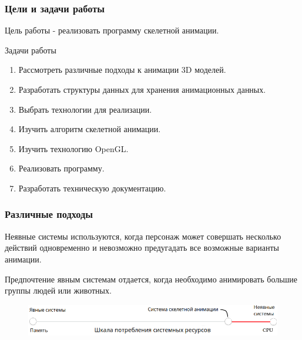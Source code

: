 \documentclass{beamer}
\begin{document}
\begin{frame}
\frametitle{Цели и задачи работы}
    Цель работы - реализовать программу скелетной анимации.
    
    \bigskip
    
    Задачи работы
    
    \smallskip
	\begin{enumerate}
	\item Рассмотреть различные подходы к анимации 3D моделей.
	\item Разработать структуры данных для хранения анимационных данных.
	\item Выбрать технологии для реализации.
	\item Изучить алгоритм скелетной анимации.
	\item Изучить технологию OpenGL.
	\item Реализовать программу.
	\item Разработать техническую документацию.
	\end{enumerate}
    
\end{frame}


\begin{frame}
\frametitle{Различные подходы}
\begin{small}
    \alert{Неявные системы} используются, когда персонаж может совершать несколько действий одновременно и невозможно предугадать все возможные варианты анимации.
    
    \smallskip
    Предпочтение \alert{явным системам} отдается, когда необходимо анимировать большие группы людей или животных.
    
\begin{figure}[h!]
    \centering
    \includegraphics[width=1\textwidth]{raw_graph_cpu_vs_ram.png}
\end{figure}

\end{small}
\end{frame}
\end{document}
